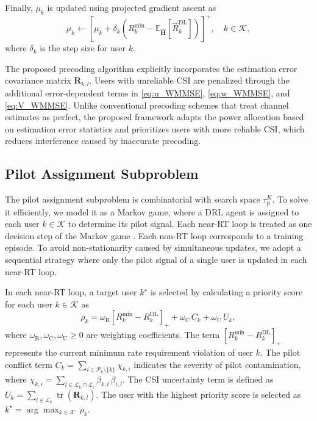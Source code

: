 \documentclass[10pt, conference]{IEEEtran}
\DeclareMathOperator{\tr}{tr}
\begin{document}
Finally, $\mu_k$ is updated using projected gradient ascent as
\begin{equation}\label{eq:mu_update}
    \mu_k \xleftarrow{} \left[\mu_k + \delta_k \left( R_{k}^{\textrm{min}} - \mathbb{E}_{\hat{\mathbf{H}}} \left[\hat{R}_k^{\textrm{DL}}\right] \right)\right]^+, \quad k \in \mathcal{K},
\end{equation}
where $\delta_k$ is the step size for user $k$. 

The proposed precoding algorithm explicitly incorporates the estimation error covariance matrix $\mathbf{R}_{k,l}$. Users with unreliable CSI are penalized through the additional error-dependent terms in \eqref{eq:u_WMMSE}, \eqref{eq:w_WMMSE}, and \eqref{eq:V_WMMSE}. Unlike conventional precoding schemes that treat channel estimates as perfect, the proposed framework adapts the power allocation based on estimation error statistics and prioritizes users with more reliable CSI, which reduces interference caused by inaccurate precoding.


\subsection{Pilot Assignment Subproblem}\label{sec:pilot_assignment}
The pilot assignment subproblem is combinatorial with search space $\tau_\mathrm{p}^K$. To solve it efficiently, we model it as a Markov game, where a DRL agent is assigned to each user $k \in \mathcal{K}$ to determine its pilot signal. 
Each near-RT loop is treated as one decision step of the Markov game \cite{MIMO:pilot1}. Each non-RT loop corresponds to a training episode.
To avoid non-stationarity caused by simultaneous updates, we adopt a sequential strategy where only the pilot signal of a single user is updated in each near-RT loop.

In each near-RT loop, a target user $k^\star$ is selected by calculating a priority score for each user $k \in \mathcal{K}$ as
\begin{equation}\label{eq:priority_score}
    \rho_k = \omega_\mathrm{R} \left[R_k^{\min} - R_k^{\mathrm{DL}}\right]_+ + \omega_\mathrm{C} \, C_k + \omega_\mathrm{U} \, U_k,
\end{equation}
where $\omega_\mathrm{R}, \omega_\mathrm{C}, \omega_\mathrm{U} \geq 0$ are weighting coefficients. The term $\left[R_k^{\min} - R_k^{\mathrm{DL}}\right]_+$ represents the current minimum rate requirement violation of user $k$. The pilot conflict term $C_k = \sum_{i \in \mathcal{P}_k\setminus\{k\}} \chi_{k,i}$ indicates the severity of pilot contamination, where $\chi_{k,i} = \sum_{l \in \mathcal{L}_k \cap \mathcal{L}_i} \beta_{k,l} \, \beta_{i,l}$.
The CSI uncertainty term is defined as $U_k = \sum_{l \in \mathcal{L}_k} \tr \left(\mathbf{R}_{k,l}\right)$. The user with the highest priority score is selected as $k^\star = \arg\max_{k \in \mathcal{K}} \, \rho_k$.
\end{document}
